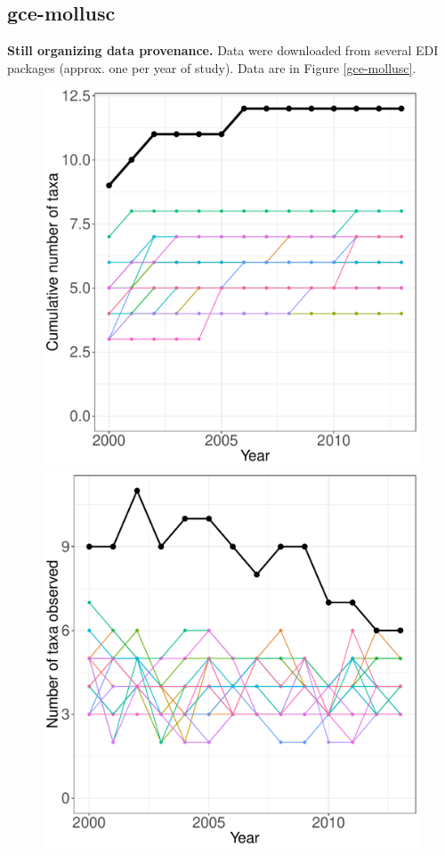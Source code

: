 \documentclass[11pt, oneside]{article}
\begin{document}
\subsection {gce-mollusc}
{\bf Still organizing data provenance.}
Data were downloaded from several EDI packages (approx. one per year of study).%
Data are in Figure \ref{gce-mollusc}.

\begin{figure}[h!]
\centering
\includegraphics[scale = 0.4]{gce-mollusc-compagnoni_species_accumulation_curve.pdf}
\includegraphics[scale = 0.4]{gce-mollusc-compagnoni_num_taxa_over_time.pdf}

\end{figure}
\end{document}
